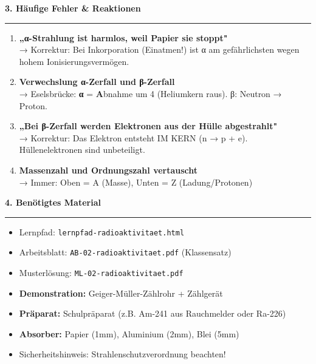 \documentclass[11pt, a4paper]{article}
\newcommand{\abschnitt}[1]{%
    \vspace{10pt}\noindent\textbf{\textcolor{physik}{\large #1}}\vspace{6pt}\hrule\vspace{8pt}
}
\begin{document}
\vspace{12pt}

\abschnitt{3. Häufige Fehler \& Reaktionen}

\begin{warnbox}
\begin{enumerate}
\item \textbf{„α-Strahlung ist harmlos, weil Papier sie stoppt"}\\
→ Korrektur: Bei Inkorporation (Einatmen!) ist α am gefährlichsten wegen hohem Ionisierungsvermögen.

\item \textbf{Verwechslung α-Zerfall und β-Zerfall}\\
→ Eselsbrücke: \textbf{α} = \textbf{A}bnahme um 4 (Heliumkern raus). β: Neutron → Proton.

\item \textbf{„Bei β-Zerfall werden Elektronen aus der Hülle abgestrahlt"}\\
→ Korrektur: Das Elektron entsteht IM KERN (n → p + e). Hüllenelektronen sind unbeteiligt.

\item \textbf{Massenzahl und Ordnungszahl vertauscht}\\
→ Immer: Oben = A (Masse), Unten = Z (Ladung/Protonen)
\end{enumerate}
\end{warnbox}

\vspace{12pt}

\abschnitt{4. Benötigtes Material}

\begin{itemize}
\item Lernpfad: \texttt{lernpfad-radioaktivitaet.html}
\item Arbeitsblatt: \texttt{AB-02-radioaktivitaet.pdf} (Klassensatz)
\item Musterlösung: \texttt{ML-02-radioaktivitaet.pdf}
\item \textbf{Demonstration:} Geiger-Müller-Zählrohr + Zählgerät
\item \textbf{Präparat:} Schulpräparat (z.B. Am-241 aus Rauchmelder oder Ra-226)
\item \textbf{Absorber:} Papier (1mm), Aluminium (2mm), Blei (5mm)
\item Sicherheitshinweis: Strahlenschutzverordnung beachten!
\end{itemize}
\end{document}
